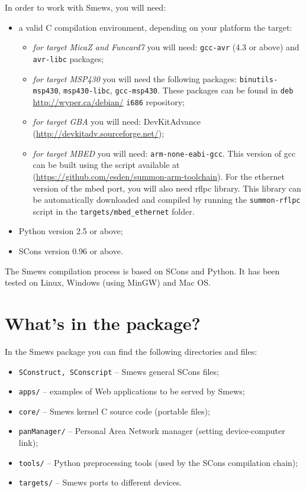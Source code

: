\documentclass{report}
\begin{document}
In order to work with Smews, you will need:
\begin{itemize}
  \item a valid C compilation environment, depending on your platform the target:
	\begin{itemize}
	  \item \emph{for target MicaZ and Funcard7} you will need: \verb+gcc-avr+  (4.3 or above) and \verb+avr-libc+ packages;
	  \item \emph{for target MSP430} you will need the following packages: \verb+binutils-msp430+, \verb+msp430-libc+, \verb+gcc-msp430+. These packages can be found in \verb+deb+ \url{http://wyper.ca/debian/} \verb+i686+ repository;
	  \item \emph{for target GBA} you will need: DevKitAdvance (\url{http://devkitadv.sourceforge.net/});
	  \item \emph{for target MBED} you will need: \verb+arm-none-eabi-gcc+. This version of gcc can be built using the script available at (\url{https://github.com/esden/summon-arm-toolchain}). For the ethernet version of the mbed port, you will also need rflpc library. This library can be automatically downloaded and compiled by running the \verb!summon-rflpc! script in the \verb!targets/mbed_ethernet! folder.
	\end{itemize}
  \item Python version 2.5 or above;
  \item SCons version 0.96 or above.
\end{itemize}

The Smews compilation process is based on SCons and Python. It has been tested on Linux, Windows (using MinGW) and Mac OS.

\section{What's in the package?}

In the Smews package you can find the following directories and files:
\begin{itemize}
\item \verb+SConstruct, SConscript+
-- Smews general SCons files;
\item \verb+apps/+
-- examples of Web applications to be served by Smews;
\item \verb+core/+
-- Smews kernel C source code (portable files);
\item \verb+panManager/+
-- Personal Area Network manager (setting device-computer link);
\item \verb+tools/+
-- Python preprocessing tools (used by the SCons compilation chain);
\item \verb+targets/+
-- Smews ports to different devices.
\end{itemize}
\end{document}
